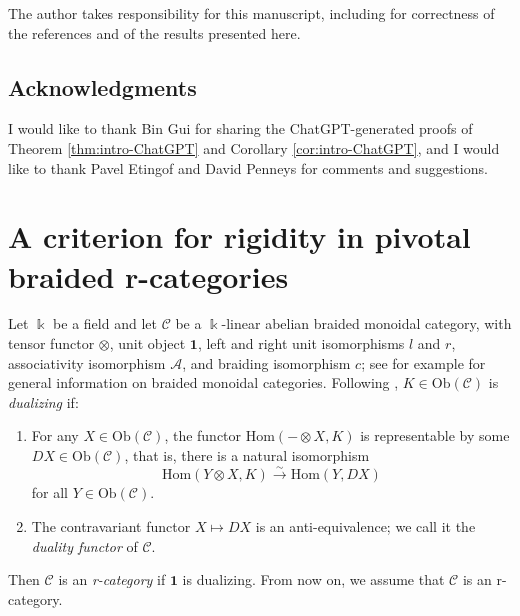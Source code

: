 \documentclass[11pt, reqno]{amsart}
\theoremstyle{definition}\newtheorem{defi}[thm]{Definition}
\theoremstyle{definition}\newtheorem{rem}[thm]{Remark}
\theoremstyle{definition}\newtheorem{exam}[thm]{Example}
\theoremstyle{definition}\newtheorem{assum}[thm]{Assumption}
\newcommand{\cA}{\mathcal{A}}
\newcommand{\cC}{\mathcal{C}}
\newcommand{\vac}{\mathbf{1}}
\begin{document}
 The author takes responsibility for this manuscript, including for correctness of the references and of the results presented here.


\subsection*{Acknowledgments}

I would like to thank Bin Gui for sharing the ChatGPT-generated proofs of Theorem \ref{thm:intro-ChatGPT} and Corollary \ref{cor:intro-ChatGPT}, and I would like to thank Pavel Etingof and David Penneys for comments and suggestions.





\section{A criterion for rigidity in pivotal braided r-categories}\label{sec:rig-crit}

Let $\Bbbk$ be a field and let $\cC$ be a $\Bbbk$-linear abelian braided monoidal category, with tensor functor $\otimes$, unit object $\vac$, left and right unit isomorphisms $l$ and $r$, associativity isomorphism $\cA$, and braiding isomorphism $c$; see for example \cite{EGNO} for general information on braided monoidal categories. Following \cite{BD}, $K\in\mathrm{Ob}(\cC)$ is \textit{dualizing} if:
\begin{enumerate}

\item For any $X\in\mathrm{Ob}(\cC)$, the functor $\mathrm{Hom}(-\otimes X, K)$ is representable by some $DX\in\mathrm{Ob}(\cC)$, that is, there is a natural isomorphism
\begin{equation}\label{eqn:GV-nat-iso}
\mathrm{Hom}(Y\otimes X, K) \xrightarrow{\sim} \mathrm{Hom}(Y,DX)
\end{equation}
for all $Y\in\mathrm{Ob}(\cC)$.

\item The contravariant functor $X\mapsto DX$ is an anti-equivalence; we call it the \textit{duality functor} of $\cC$.

\end{enumerate}
Then $\cC$ is an \textit{r-category} if $\vac$ is dualizing. From now on, we assume that $\cC$ is an r-category.
\end{document}
